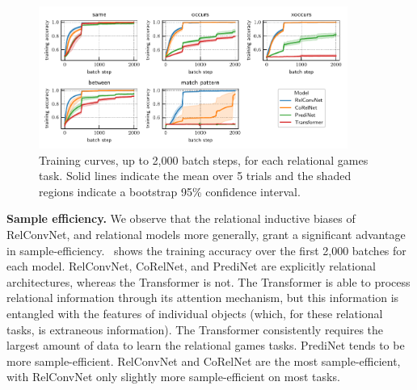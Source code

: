 \begin{figure}
    \centering
    \includegraphics[width=0.9\textwidth]{figs/experiments/all_training_curves.pdf}
    \vskip-5pt
    \caption{Training curves, up to 2,000 batch steps, for each relational games task. Solid lines indicate the mean over 5 trials and the shaded regions indicate a bootstrap 95\% confidence interval.}\label{fig:training_curves}
    \vskip-15pt
\end{figure}

\textbf{Sample efficiency.} We observe that the relational inductive biases of RelConvNet, and relational models more generally, grant a significant advantage in sample-efficiency.~ shows the training accuracy over the first 2,000 batches for each model. RelConvNet, CoRelNet, and PrediNet are explicitly relational architectures, whereas the Transformer is not. The Transformer is able to process relational information through its attention mechanism, but this information is entangled with the features of individual objects (which, for these relational tasks, is extraneous information). The Transformer consistently requires the largest amount of data to learn the relational games tasks. PrediNet tends to be more sample-efficient. RelConvNet and CoRelNet are the most sample-efficient, with RelConvNet only slightly more sample-efficient on most tasks.

